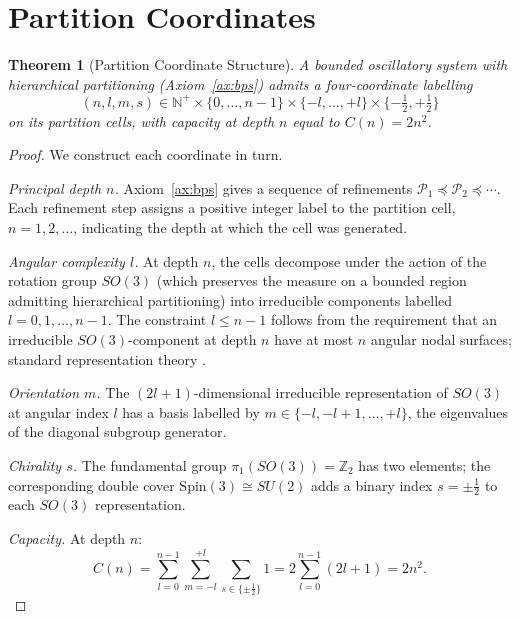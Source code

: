\documentclass[11pt,a4paper]{article}
\theoremstyle{thmstyle}
\newtheorem{theorem}{Theorem}[section]
\theoremstyle{axiomstyle}
\theoremstyle{definition}
\theoremstyle{remark}
\newcommand{\Natural}{\mathbb{N}}
\newcommand{\Integer}{\mathbb{Z}}
\newcommand{\Pspace}{\mathcal{P}}
\begin{document}
\section{Partition Coordinates}
\label{sec:partitioncoords}

\begin{theorem}[Partition Coordinate Structure]\label{thm:partitioncoords}
A bounded oscillatory system with hierarchical partitioning (Axiom~\ref{ax:bps}) admits a four-coordinate labelling
\begin{equation}
(n,l,m,s)\in\Natural^{+}\times\{0,\ldots,n-1\}\times\{-l,\ldots,+l\}\times\{-\tfrac{1}{2},+\tfrac{1}{2}\}
\end{equation}
on its partition cells, with capacity at depth $n$ equal to $C(n)=2n^{2}$.
\end{theorem}

\begin{proof}
We construct each coordinate in turn.

\emph{Principal depth $n$.} Axiom~\ref{ax:bps} gives a sequence of refinements $\Pspace_{1}\preceq\Pspace_{2}\preceq\cdots$. Each refinement step assigns a positive integer label to the partition cell, $n=1,2,\ldots$, indicating the depth at which the cell was generated.

\emph{Angular complexity $l$.} At depth $n$, the cells decompose under the action of the rotation group $SO(3)$ (which preserves the measure on a bounded region admitting hierarchical partitioning) into irreducible components labelled $l=0,1,\ldots,n-1$. The constraint $l\leq n-1$ follows from the requirement that an irreducible $SO(3)$-component at depth $n$ have at most $n$ angular nodal surfaces; standard representation theory \citep{wigner1959,naimark1964}.

\emph{Orientation $m$.} The $(2l+1)$-dimensional irreducible representation of $SO(3)$ at angular index $l$ has a basis labelled by $m\in\{-l,-l+1,\ldots,+l\}$, the eigenvalues of the diagonal subgroup generator.

\emph{Chirality $s$.} The fundamental group $\pi_{1}(SO(3))=\Integer_{2}$ has two elements; the corresponding double cover $\mathrm{Spin}(3)\cong SU(2)$ adds a binary index $s=\pm\tfrac{1}{2}$ to each $SO(3)$ representation.

\emph{Capacity.} At depth $n$:
\begin{equation}
C(n)=\sum_{l=0}^{n-1}\sum_{m=-l}^{+l}\sum_{s\in\{\pm\tfrac{1}{2}\}}1=2\sum_{l=0}^{n-1}(2l+1)=2n^{2}.
\end{equation}
\end{proof}
\end{document}
